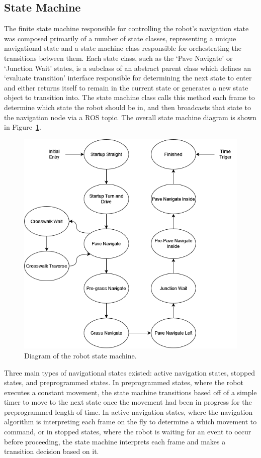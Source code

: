 \documentclass[titlepage, twocolumn]{article}
\begin{document}
    \subsection{State Machine}
        The finite state machine responsible for controlling the robot's navigation state was composed primarily of a number of state classes, representing a unique navigational state and a state machine class responsible for orchestrating the transitions between them. Each state class, such as the `Pave Navigate' or `Junction Wait' states, is a subclass of an abstract parent class which defines an `evaluate transition' interface responsible for determining the next state to enter and either returns itself to remain in the current state or generates a new state object to transition into. The state machine class calls this method each frame to determine which state the robot should be in, and then broadcasts that state to the navigation node via a ROS topic. The overall state machine diagram is shown in Figure~\ref{fig:statemachine}.

        \begin{figure}
            \includegraphics[width=\linewidth]{statemachine.png}
            \caption{Diagram of the robot state machine.}
            \label{fig:statemachine}
        \end{figure}

        Three main types of navigational states existed: active navigation states, stopped states, and preprogrammed states. In preprogrammed states, where the robot executes a constant movement, the state machine transitions based off of a simple timer to move to the next state once the movement had been in progress for the preprogrammed length of time. In active navigation states, where the navigation algorithm is interpreting each frame on the fly to determine a which movement to command, or in stopped states, where the robot is waiting for an event to occur before proceeding, the state machine interprets each frame and makes a transition decision based on it.
\end{document}

